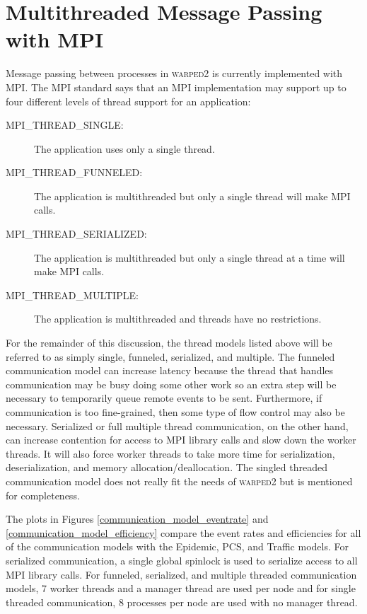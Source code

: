 \documentclass[11pt]{book}
\begin{document}
\section{Multithreaded Message Passing with MPI}

Message passing between processes in \textsc{warped2} is currently implemented with MPI.
The MPI standard says that an MPI implementation may support up to four different levels of
thread support for an application:

\begin{description}
    \item[MPI\_THREAD\_SINGLE:] The application uses only a single thread.  
    \item[MPI\_THREAD\_FUNNELED:] The application is multithreaded but only a single thread will
        make MPI calls.
    \item[MPI\_THREAD\_SERIALIZED:] The application is multithreaded but only a single thread at
        a time will make MPI calls.
    \item[MPI\_THREAD\_MULTIPLE:] The application is multithreaded and threads have no restrictions.
\end{description}

For the remainder of this discussion, the thread models listed above will be referred to as
simply single, funneled, serialized, and multiple.  The funneled communication model can
increase latency because the thread that handles communication may be busy doing some other
work so an extra step will be necessary to temporarily queue remote events to be sent.
Furthermore, if communication is too fine-grained, then some type of flow control may also be
necessary.  Serialized or full multiple thread communication, on the other hand, can increase
contention for access to MPI library calls and slow down the worker threads.  It will also
force worker threads to take more time for serialization, deserialization, and memory
allocation/deallocation.  The singled threaded communication model does not really fit the
needs of \textsc{warped2} but is mentioned for completeness.

The plots in Figures \ref{communication_model_eventrate} and \ref{communication_model_efficiency}
compare the event rates and efficiencies for all of the communication models with the Epidemic,
PCS, and Traffic models.  For serialized communication, a single global spinlock is used to
serialize access to all MPI library calls.  For funneled, serialized, and multiple threaded
communication models, 7 worker threads and a manager thread are used per node and for single
threaded communication, 8 processes per node are used with no manager thread.
\end{document}
